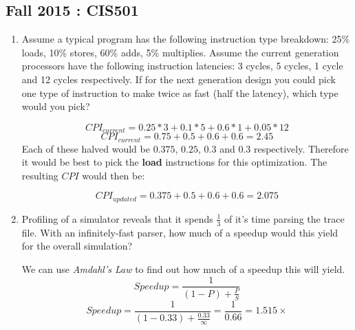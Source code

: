 \documentclass[12pt]{article}
\newenvironment{QandA}{\begin{enumerate}[label=\bfseries\arabic*.]\bfseries}
                      {\end{enumerate}}
\newenvironment{answered}{\par\quad\normalfont}{}
\begin{document}
\subsection{Fall 2015 : CIS501}

\begin{QandA}
   \item Assume a typical program has the following instruction type breakdown: 25\% loads, 10\% stores, 60\% adds, 5\% multiplies. Assume the current generation processors have the following instruction latencies: 3 cycles, 5 cycles, 1 cycle and 12 cycles respectively. If for the next generation design you could pick one type of instruction to make twice as fast (half the latency), which type would you pick?
        \begin{answered}
        \begin{equation*}
            CPI_{current} = 0.25 * 3 + 0.1 * 5 + 0.6 * 1 + 0.05 * 12
        \end{equation*}
        \begin{equation*}
            CPI_{current} = 0.75 + 0.5 + 0.6 + 0.6 = 2.45
        \end{equation*}
        Each of these halved would be $0.375$, $0.25$, $0.3$ and $0.3$ respectively. Therefore it would be best to pick the \textbf{load} instructions for this optimization. The resulting $CPI$ would then be:
        
        \begin{equation*}
            CPI_{updated} = 0.375 + 0.5 + 0.6 + 0.6 = 2.075
        \end{equation*}
        \end{answered}
        
    \item Profiling of a simulator reveals that it spends $\frac{1}{3}$ of it's time parsing the trace file. With an infinitely-fast parser, how much of a speedup would this yield for the overall simulation?
        \begin{answered}
        We can use \textit{Amdahl's Law} to find out how much of a speedup this will yield.
        \begin{equation*}
            Speedup = \frac{1}{(1-P) + \frac{P}{S}}
        \end{equation*}
        \begin{equation*}
            Speedup = \frac{1}{(1-0.33) + \frac{0.33}{\infty}} = \frac{1}{0.66} = 1.515 \times 
        \end{equation*}        
        \end{answered}
\end{QandA}
\end{document}
